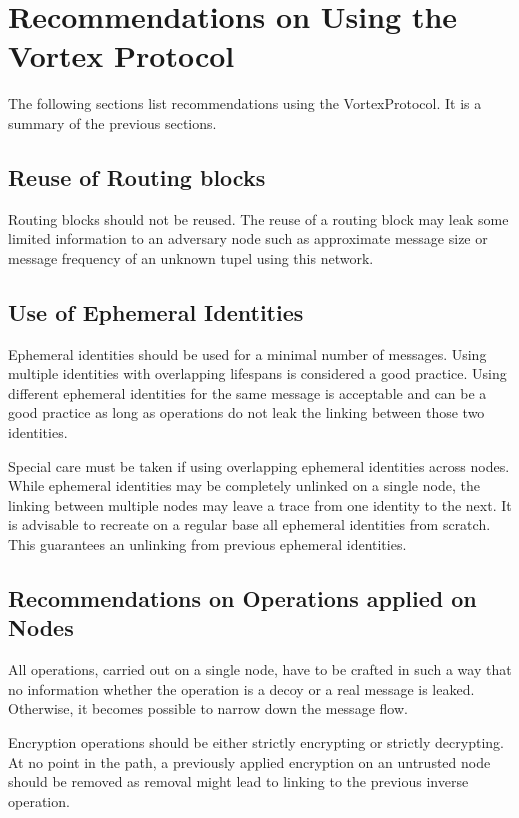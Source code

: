   \chapter{Recommendations on Using the Vortex Protocol}
The following sections list recommendations using the VortexProtocol. It is a summary of the previous sections.

\section{Reuse of Routing blocks\label{sec:reuseRB}}
Routing blocks should not be reused. The reuse of a routing block may leak some limited information to an adversary node such as approximate message size or message frequency of an unknown tupel using this network.

\section{Use of Ephemeral Identities}
Ephemeral identities should be used for a minimal number of messages. Using multiple identities with overlapping lifespans is considered a good practice. Using different ephemeral identities for the same message is acceptable and can be a good practice as long as operations do not leak the linking between those two identities.

Special care must be taken if using overlapping ephemeral identities across nodes. While ephemeral identities may be completely unlinked on a single node, the linking between multiple nodes may leave a trace from one identity to the next. It is advisable to recreate on a regular base all ephemeral identities from scratch. This guarantees an unlinking from previous ephemeral identities.

\section{Recommendations on Operations applied on Nodes}
All operations, carried out on a single node, have to be crafted in such a way that no information whether the operation is a decoy or a real message is leaked. Otherwise, it becomes possible to narrow down the message flow.

Encryption operations should be either strictly encrypting or strictly decrypting. At no point in the path, a previously applied encryption on an untrusted node should be removed as removal might lead to linking to the previous inverse operation.

